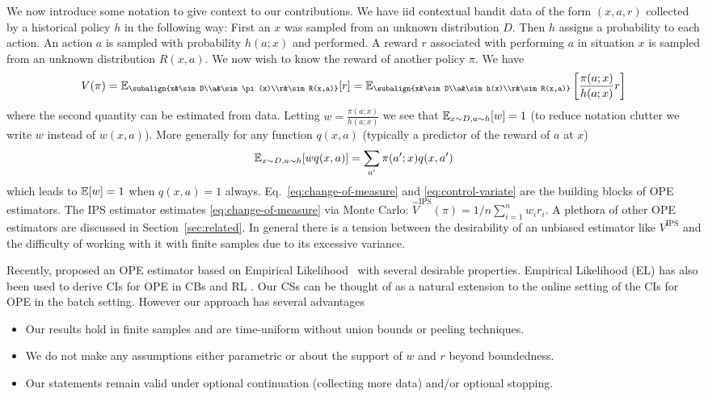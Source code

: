 We now introduce some notation to give context to our contributions.  We have
iid contextual bandit data of the form $(x,a,r)$ collected by a historical
policy $h$ in the following way: First an $x$ was sampled from an unknown
distribution $D$.  Then $h$ assigns a probability to each action.  An action
$a$ is sampled with probability $h(a;x)$ and performed. A reward $r$ associated
with performing $a$ in situation $x$ is sampled from an unknown distribution
$R(x,a)$.  We now wish to know the reward of another policy $\pi$. We have
\begin{equation}
\label{eq:change-of-measure}
V(\pi) = \E_{\subalign{x&\sim D\\a&\sim\pi(x)\\r&\sim R(x,a)}}[r]
=
\E_{\subalign{x&\sim D\\a&\sim h(x)\\r&\sim R(x,a)}}\left[\frac{\pi(a;x)}{h(a;x)}r\right]
\end{equation}
where the second quantity can be estimated from data.
%
Letting $w=\frac{\pi(a;x)}{h(a;x)}$  we see that 
$\mathbb{E}_{x\sim D,a\sim h}[w]=1$
(to reduce notation clutter we write $w$ instead of $w(x,a)$). More generally
for any function $q(x,a)$ (typically a predictor of the reward of $a$ at $x$)
\begin{equation}
\label{eq:control-variate}
\mathbb{E}_{x\sim D,a\sim h}[w q(x,a)] = \sum_{a'} \pi(a';x) q(x,a')    
\end{equation}
which leads to $\mathbb{E}[w]=1$ when $q(x,a)=1$ always.
Eq.~\eqref{eq:change-of-measure} and \eqref{eq:control-variate} are the
building blocks of OPE estimators.  The IPS estimator \cite{HT52} estimates
\eqref{eq:change-of-measure} via Monte Carlo: $\hat{V}^{\textrm{IPS}}(\pi) =
1/n \sum_{i=1}^n w_i r_i $.  A plethora of other OPE estimators are discussed
in Section~\ref{sec:related}. In general there is a tension between the
desirability of an unbiased estimator like $V^{\textrm{IPS}}$ and the
difficulty of working with it with finite samples due to its excessive
variance.

Recently, \cite{kallus2019intrinsically} proposed an OPE estimator based on
Empirical Likelihood~\cite{owen2001empirical} with several desirable
properties. Empirical Likelihood (EL) has also been used to derive CIs for OPE
in CBs \cite{karampatziakis2019empirical} and RL \cite{dai2020coindice}. Our
CSs can be thought of as a natural extension to the online setting of the CIs
for OPE in the batch setting. However our approach has several advantages
\begin{itemize}
\item Our results hold in finite samples and are
time-uniform without union bounds or peeling techniques.
\item We do not make any assumptions either parametric 
or about the support of $w$ and $r$ beyond boundedness.
\item Our statements remain valid under optional 
continuation (collecting more data) and/or optional stopping.
\end{itemize}

